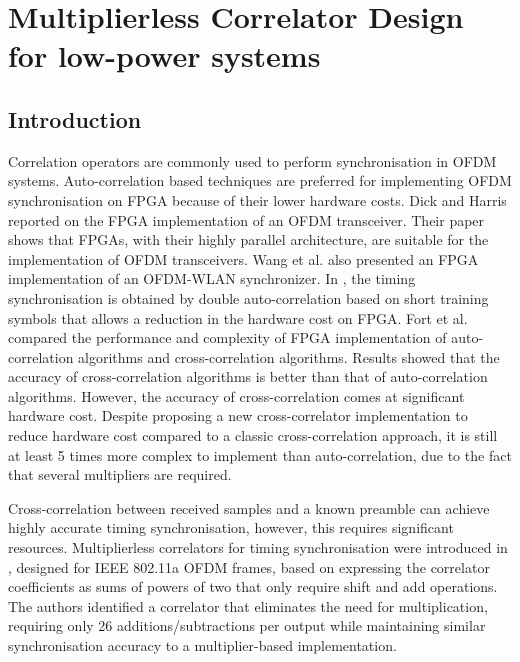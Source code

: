 \chapter{Multiplierless Correlator Design for low-power systems}
\label{chap:multiplierlesscorrelator}

\section{Introduction}
Correlation operators are commonly used to perform synchronisation in OFDM systems.
Auto-correlation based techniques are preferred for implementing  OFDM synchronisation on FPGA because of their lower hardware costs. 
Dick and Harris \cite{Dick2003} reported on the FPGA implementation of an OFDM transceiver. 
Their paper shows that FPGAs, with their highly parallel architecture, are suitable for the implementation of OFDM transceivers.
Wang et al. \cite{Wang2004} also presented an FPGA implementation of an OFDM-WLAN synchronizer. 
In \cite{Wang2004}, the timing synchronisation is obtained by double auto-correlation based on short training symbols that allows a reduction in the hardware cost on FPGA. 
Fort et al. \cite{Fort2003} compared  the performance and complexity of FPGA implementation of auto-correlation algorithms and cross-correlation algorithms.
Results showed that the accuracy of cross-correlation algorithms is better than that of auto-correlation algorithms. 
However, the accuracy of cross-correlation comes at significant hardware cost. 
Despite proposing a new cross-correlator implementation to reduce hardware cost compared to a classic cross-correlation approach, it is still at least 5 times more complex to implement than auto-correlation, due to the fact that several multipliers are required. 

Cross-correlation between received samples and a known preamble can achieve highly accurate timing synchronisation, however, this requires significant resources. 
Multiplierless correlators for timing synchronisation were introduced in \cite{Yip2003}, designed for IEEE 802.11a OFDM frames, based on expressing the correlator coefficients as sums of powers of two that only require shift and add operations. 
The authors identified a correlator that eliminates the need for multiplication, requiring only 26 additions/subtractions per output while maintaining similar synchronisation accuracy to a multiplier-based implementation.

